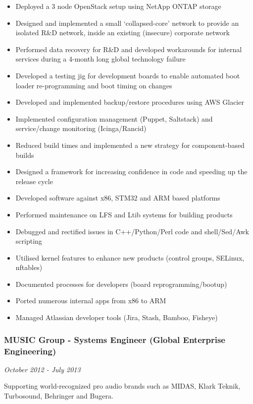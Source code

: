 \begin{itemize}
\tightlist
\item
  Deployed a 3 node OpenStack setup using NetApp ONTAP storage
\item
  Designed and implemented a small `collapsed-core' network to provide
  an isolated R\&D network, inside an existing (insecure) corporate
  network
\item
  Performed data recovery for R\&D and developed workarounds for
  internal services during a 4-month long global technology failure
\item
  Developed a testing jig for development boards to enable automated
  boot loader re-programming and boot timing on changes
\item
  Developed and implemented backup/restore procedures using AWS Glacier
\item
  Implemented configuration management (Puppet, Saltstack) and
  service/change monitoring (Icinga/Rancid)
\item
  Reduced build times and implemented a new strategy for component-based
  builds
\item
  Designed a framework for increasing confidence in code and speeding up
  the release cycle
\item
  Developed software against x86, STM32 and ARM based platforms
\item
  Performed maintenance on LFS and Ltib systems for building products
\item
  Debugged and rectified issues in C++/Python/Perl code and
  shell/Sed/Awk scripting
\item
  Utilised kernel features to enhance new products (control groups,
  SELinux, nftables)
\item
  Documented processes for developers (board reprogramming/bootup)
\item
  Ported numerous internal apps from x86 to ARM
\item
  Managed Atlassian developer tools (Jira, Stash, Bamboo, Fisheye)
\end{itemize}

\subsubsection{MUSIC Group - Systems Engineer (Global Enterprise
Engineering)}\label{music-group---systems-engineer-global-enterprise-engineering}

\emph{October 2012 - July 2013}

Supporting world-recognized pro audio brands such as MIDAS, Klark
Teknik, Turbosound, Behringer and Bugera.

